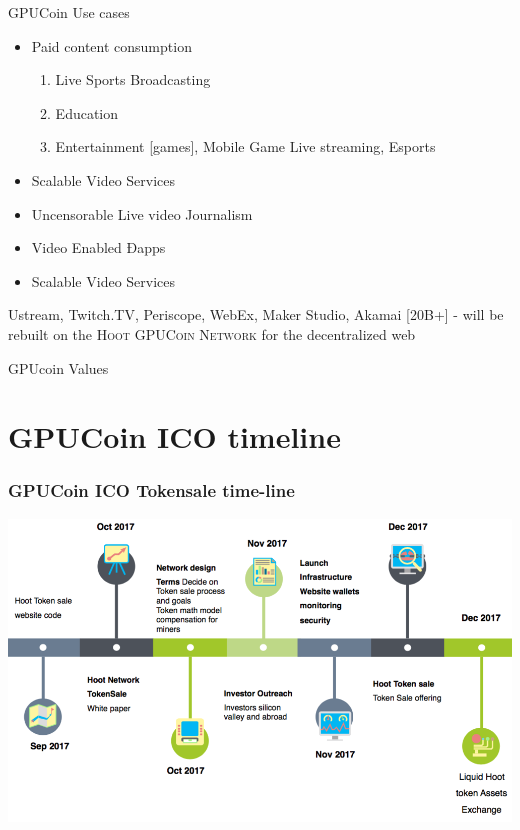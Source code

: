 

\begin{frame}[fragile]{GPUCoin Use cases}
 \begin{itemize}[<+-| alert@+>]%
 
\item {Paid content consumption}
\begin{enumerate}[<+-| alert@+>]
\item Live Sports Broadcasting
\item Education 
\item Entertainment [games], Mobile Game Live streaming, Esports
\end{enumerate}
\item {Scalable Video Services}
\item {Uncensorable Live video Journalism}
\item {Video Enabled Ðapps}
\item {Scalable Video Services}

\end{itemize}
\pause

\Large{
Ustream, Twitch.TV, Periscope, WebEx, Maker Studio, Akamai [20B+] - will be rebuilt on the \textsc{Hoot GPUCoin Network} for the decentralized web
}

\end{frame}
\begin{frame}[t]{GPUcoin Values}

\end{frame}

\section{GPUCoin ICO timeline}
\begin{frame}[t]\frametitle{GPUCoin ICO Tokensale time-line}
  \includegraphics[width=1.0\textwidth]{static/tstimeline-trans}
\end{frame}

